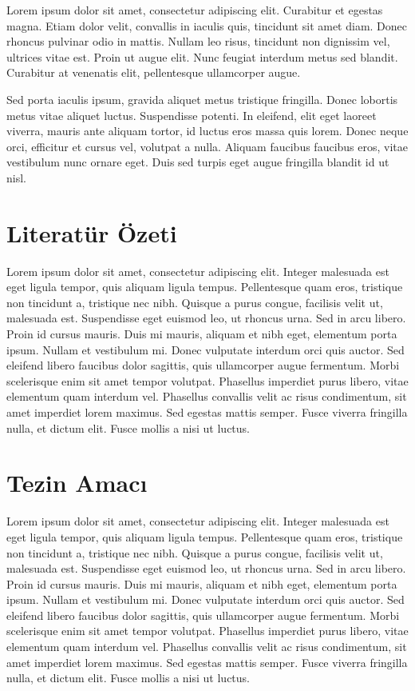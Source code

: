\documentclass[a4paper,12pt]{report}
\begin{document}

Lorem ipsum dolor sit amet, consectetur adipiscing elit. Curabitur et egestas magna. Etiam dolor velit, convallis in iaculis quis, tincidunt sit amet diam. Donec rhoncus pulvinar odio in mattis. Nullam leo risus, tincidunt non dignissim vel, ultrices vitae est. Proin ut augue elit. Nunc feugiat interdum metus sed blandit. Curabitur at venenatis elit, pellentesque ullamcorper augue.
\par
Sed porta iaculis ipsum, gravida aliquet metus tristique fringilla. Donec lobortis metus vitae aliquet luctus. Suspendisse potenti. In eleifend, elit eget laoreet viverra, mauris ante aliquam tortor, id luctus eros massa quis lorem. Donec neque orci, efficitur et cursus vel, volutpat a nulla. Aliquam faucibus faucibus eros, vitae vestibulum nunc ornare eget. Duis sed turpis eget augue fringilla blandit id ut nisl.

\section{Literatür Özeti} %
\label{sec: literatur ozeti}
Lorem ipsum dolor sit amet, consectetur adipiscing elit. Integer malesuada est eget ligula tempor, quis aliquam ligula tempus. Pellentesque quam eros, tristique non tincidunt a, tristique nec nibh. Quisque a purus congue, facilisis velit ut, malesuada est. Suspendisse eget euismod leo, ut rhoncus urna. Sed in arcu libero. Proin id cursus mauris. Duis mi mauris, aliquam et nibh eget, elementum porta ipsum. Nullam et vestibulum mi. Donec vulputate interdum orci quis auctor. Sed eleifend libero faucibus dolor sagittis, quis ullamcorper augue fermentum. Morbi scelerisque enim sit amet tempor volutpat. Phasellus imperdiet purus libero, vitae elementum quam interdum vel. Phasellus convallis velit ac risus condimentum, sit amet imperdiet lorem maximus. Sed egestas mattis semper. Fusce viverra fringilla nulla, et dictum elit. Fusce mollis a nisi ut luctus.

\section{Tezin Amacı} %
\label{sec: amaç}
Lorem ipsum dolor sit amet, consectetur adipiscing elit. Integer malesuada est eget ligula tempor, quis aliquam ligula tempus. Pellentesque quam eros, tristique non tincidunt a, tristique nec nibh. Quisque a purus congue, facilisis velit ut, malesuada est. Suspendisse eget euismod leo, ut rhoncus urna. Sed in arcu libero. Proin id cursus mauris. Duis mi mauris, aliquam et nibh eget, elementum porta ipsum. Nullam et vestibulum mi. Donec vulputate interdum orci quis auctor. Sed eleifend libero faucibus dolor sagittis, quis ullamcorper augue fermentum. Morbi scelerisque enim sit amet tempor volutpat. Phasellus imperdiet purus libero, vitae elementum quam interdum vel. Phasellus convallis velit ac risus condimentum, sit amet imperdiet lorem maximus. Sed egestas mattis semper. Fusce viverra fringilla nulla, et dictum elit. Fusce mollis a nisi ut luctus.
\end{document}
